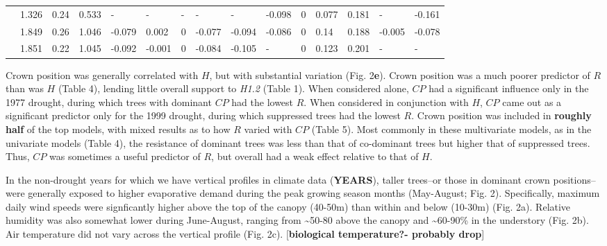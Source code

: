 \documentclass[]{article}
\begin{document}
\begin{table}[!h]
{\begin{tabular}{lrrrlllllllllll}
\hspace{1em} & 1.326 & 0.24 & 0.533 & - & - & - & - & - & -0.098 & 0 & 0.077 & 0.181 & - & -0.161\\
\hspace{1em} & 1.849 & 0.26 & 1.046 & -0.079 & 0.002 & 0 & -0.077 & -0.094 & -0.086 & 0 & 0.14 & 0.188 & -0.005 & -0.078\\
\hspace{1em} & 1.851 & 0.22 & 1.045 & -0.092 & -0.001 & 0 & -0.084 & -0.105 & - & 0 & 0.123 & 0.201 & - & -\\
\bottomrule
\end{tabular}}
\end{table}

Crown position was generally correlated with \(H\), but with substantial
variation (Fig. 2\textbf{e}). Crown position was a much poorer predictor
of \(R\) than was \(H\) (Table 4), lending little overall support to
\emph{H1.2} (Table 1). When considered alone, \(CP\) had a significant
influence only in the 1977 drought, during which trees with dominant
\(CP\) had the lowest \(R\). When considered in conjunction with \(H\),
\(CP\) came out as a significant predictor only for the 1999 drought,
during which suppressed trees had the lowest \(R\). Crown position was
included in \textbf{roughly half} of the top models, with mixed results
as to how \(R\) varied with \(CP\) (Table 5). Most commonly in these
multivariate models, as in the univariate models (Table 4), the
resistance of dominant trees was less than that of co-dominant trees but
higher that of suppressed trees. Thus, \(CP\) was sometimes a useful
predictor of \(R\), but overall had a weak effect relative to that of
\(H\).

In the non-drought years for which we have vertical profiles in climate
data (\textbf{YEARS}), taller trees--or those in dominant crown
positions-- were generally exposed to higher evaporative demand during
the peak growing season months (May-August; Fig. 2). Specifically,
maximum daily wind speeds were signficantly higher above the top of the
canopy (40-50m) than within and below (10-30m) (Fig. 2a). Relative
humidity was also somewhat lower during June-August, ranging from
\textasciitilde{}50-80 above the canopy and \textasciitilde{}60-90\% in
the understory (Fig. 2b). Air temperature did not vary across the
vertical profile (Fig. 2c). {[}\textbf{biological temperature?- probably
drop}{]}
\end{document}
